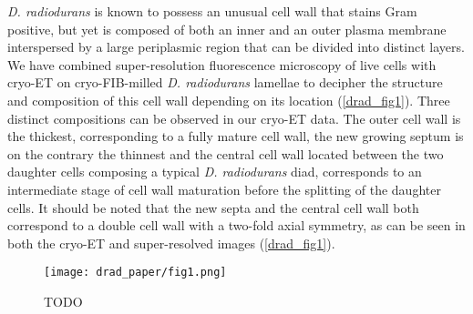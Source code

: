 \textit{D. radiodurans} is known to possess an unusual cell wall that stains Gram positive, but yet is composed of both an inner and an outer plasma membrane interspersed by a large periplasmic region that can be divided into distinct layers.
We have combined super-resolution fluorescence microscopy of live cells with cryo-ET on cryo-FIB-milled \textit{D. radiodurans} lamellae to decipher the structure and composition of this cell wall depending on its location (\autoref{drad_fig1}).
Three distinct compositions can be observed in our cryo-ET data.
The outer cell wall is the thickest, corresponding to a fully mature cell wall, the new growing septum is on the contrary the thinnest and the central cell wall located between the two daughter cells composing a typical \textit{D. radiodurans} diad, corresponds to an intermediate stage of cell wall maturation before the splitting of the daughter cells.
It should be noted that the new septa and the central cell wall both correspond to a double cell wall with a two-fold axial symmetry, as can be seen in both the cryo-ET and super-resolved images (\autoref{drad_fig1}).

\begin{figure}[ht]
    \centering
    \texttt{[image: drad\_paper/fig1.png]}
    \caption{TODO}
    \label{drad_fig1}
\end{figure}

